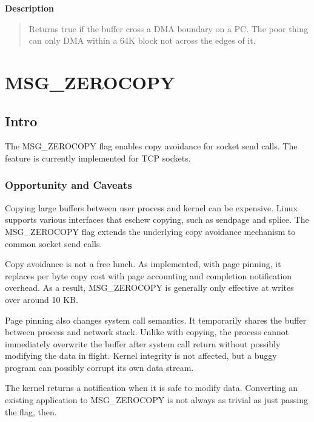 \documentclass[a4paper,8pt,english]{sphinxmanual}
\begin{document}
\textbf{Description}
\begin{quote}

Returns true if the buffer cross a DMA boundary on a PC. The poor
thing can only DMA within a 64K block not across the edges of it.
\end{quote}


\chapter{MSG\_ZEROCOPY}
\label{networking/msg_zerocopy::doc}\label{networking/msg_zerocopy:msg-zerocopy}

\section{Intro}
\label{networking/msg_zerocopy:intro}
The MSG\_ZEROCOPY flag enables copy avoidance for socket send calls.
The feature is currently implemented for TCP sockets.


\subsection{Opportunity and Caveats}
\label{networking/msg_zerocopy:opportunity-and-caveats}
Copying large buffers between user process and kernel can be
expensive. Linux supports various interfaces that eschew copying,
such as sendpage and splice. The MSG\_ZEROCOPY flag extends the
underlying copy avoidance mechanism to common socket send calls.

Copy avoidance is not a free lunch. As implemented, with page pinning,
it replaces per byte copy cost with page accounting and completion
notification overhead. As a result, MSG\_ZEROCOPY is generally only
effective at writes over around 10 KB.

Page pinning also changes system call semantics. It temporarily shares
the buffer between process and network stack. Unlike with copying, the
process cannot immediately overwrite the buffer after system call
return without possibly modifying the data in flight. Kernel integrity
is not affected, but a buggy program can possibly corrupt its own data
stream.

The kernel returns a notification when it is safe to modify data.
Converting an existing application to MSG\_ZEROCOPY is not always as
trivial as just passing the flag, then.
\end{document}
